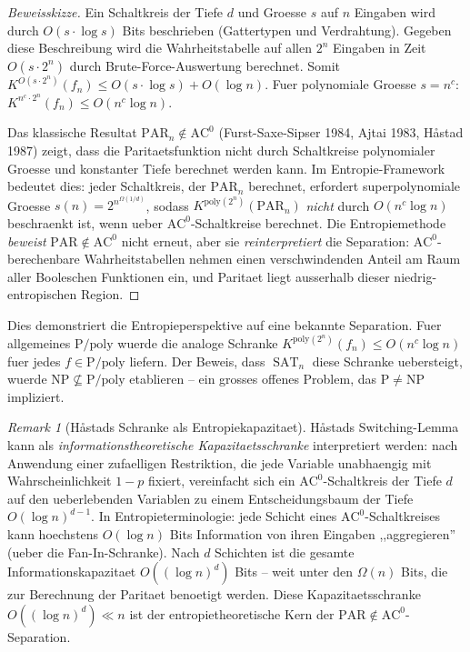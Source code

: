\documentclass[aps,prd,twocolumn,superscriptaddress,nofootinbib]{revtex4-2}
\theoremstyle{definition}
\theoremstyle{remark}
\newtheorem{remark}[theorem]{Remark}
\DeclareMathOperator{\SAT}{SAT}
\newcommand{\NP}{\mathrm{NP}}
\newcommand{\PP}{\mathrm{P}}
\begin{document}
\begin{proof}[Beweisskizze]
Ein Schaltkreis der Tiefe $d$ und Groesse $s$ auf $n$ Eingaben wird durch $O(s \cdot \log s)$ Bits beschrieben (Gattertypen und Verdrahtung). Gegeben diese Beschreibung wird die Wahrheitstabelle auf allen $2^n$ Eingaben in Zeit $O(s \cdot 2^n)$ durch Brute-Force-Auswertung berechnet. Somit $K^{O(s \cdot 2^n)}(f_n) \leq O(s \cdot \log s) + O(\log n)$. Fuer polynomiale Groesse $s = n^c$: $K^{n^c \cdot 2^n}(f_n) \leq O(n^c \log n)$.

Das klassische Resultat $\mathrm{PAR}_n \notin \mathrm{AC}^0$ (Furst-Saxe-Sipser 1984, Ajtai 1983, H\r{a}stad 1987) zeigt, dass die Paritaetsfunktion nicht durch Schaltkreise polynomialer Groesse und konstanter Tiefe berechnet werden kann. Im Entropie-Framework bedeutet dies: jeder Schaltkreis, der $\mathrm{PAR}_n$ berechnet, erfordert superpolynomiale Groesse $s(n) = 2^{n^{\Omega(1/d)}}$, sodass $K^{\mathrm{poly}(2^n)}(\mathrm{PAR}_n)$ \textit{nicht} durch $O(n^c \log n)$ beschraenkt ist, wenn ueber $\mathrm{AC}^0$-Schaltkreise berechnet. Die Entropiemethode \textit{beweist} $\mathrm{PAR} \notin \mathrm{AC}^0$ nicht erneut, aber sie \textit{reinterpretiert} die Separation: $\mathrm{AC}^0$-berechenbare Wahrheitstabellen nehmen einen verschwindenden Anteil am Raum aller Booleschen Funktionen ein, und Paritaet liegt ausserhalb dieser niedrig-entropischen Region.
\end{proof}

Dies demonstriert die Entropieperspektive auf eine bekannte Separation. Fuer allgemeines $\PP/\mathrm{poly}$ wuerde die analoge Schranke $K^{\mathrm{poly}(2^n)}(f_n) \leq O(n^c \log n)$ fuer jedes $f \in \PP/\mathrm{poly}$ liefern. Der Beweis, dass $\SAT_n$ diese Schranke uebersteigt, wuerde $\NP \not\subseteq \PP/\mathrm{poly}$ etablieren -- ein grosses offenes Problem, das $\PP \neq \NP$ impliziert.

\begin{remark}[H\r{a}stads Schranke als Entropiekapazitaet]
\label{rem:hastad-entropy}
H\r{a}stads Switching-Lemma~\cite{Hastad1987} kann als \emph{informationstheoretische Kapazitaetsschranke} interpretiert werden: nach Anwendung einer zufaelligen Restriktion, die jede Variable unabhaengig mit Wahrscheinlichkeit $1-p$ fixiert, vereinfacht sich ein $\mathrm{AC}^0$-Schaltkreis der Tiefe $d$ auf den ueberlebenden Variablen zu einem Entscheidungsbaum der Tiefe $O(\log n)^{d-1}$. In Entropieterminologie: jede Schicht eines $\mathrm{AC}^0$-Schaltkreises kann hoechstens $O(\log n)$ Bits Information von ihren Eingaben ,,aggregieren'' (ueber die Fan-In-Schranke). Nach $d$ Schichten ist die gesamte Informationskapazitaet $O((\log n)^d)$ Bits -- weit unter den $\Omega(n)$ Bits, die zur Berechnung der Paritaet benoetigt werden. Diese Kapazitaetsschranke $O((\log n)^d) \ll n$ ist der entropietheoretische Kern der $\mathrm{PAR} \notin \mathrm{AC}^0$-Separation.
\end{remark}
\end{document}
